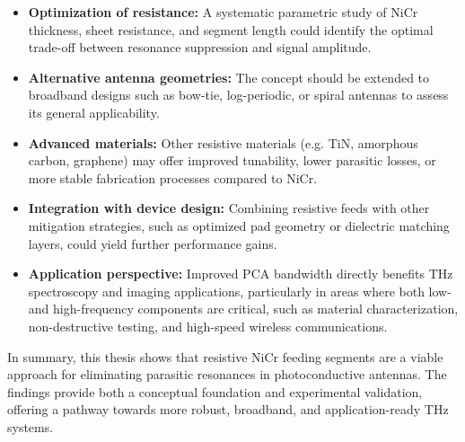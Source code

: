 \begin{itemize}
    \item \textbf{Optimization of resistance:} A systematic parametric study of NiCr thickness, sheet resistance,
    and segment length could identify the optimal trade-off between resonance suppression and signal amplitude.
    
    \item \textbf{Alternative antenna geometries:} The concept should be extended to broadband designs such as
    bow-tie, log-periodic, or spiral antennas to assess its general applicability.
    
    \item \textbf{Advanced materials:} Other resistive materials (e.g. TiN, amorphous carbon, graphene) may
    offer improved tunability, lower parasitic losses, or more stable fabrication processes compared to NiCr.
    
    \item \textbf{Integration with device design:} Combining resistive feeds with other mitigation strategies, such
    as optimized pad geometry or dielectric matching layers, could yield further performance gains.
    
    \item \textbf{Application perspective:} Improved PCA bandwidth directly benefits THz spectroscopy and
    imaging applications, particularly in areas where both low- and high-frequency components are critical,
    such as material characterization, non-destructive testing, and high-speed wireless communications.
\end{itemize}

\noindent
In summary, this thesis shows that resistive NiCr feeding segments are a viable approach for eliminating
parasitic resonances in photoconductive antennas. The findings provide both a conceptual foundation and
experimental validation, offering a pathway towards more robust, broadband, and application-ready THz
systems.
